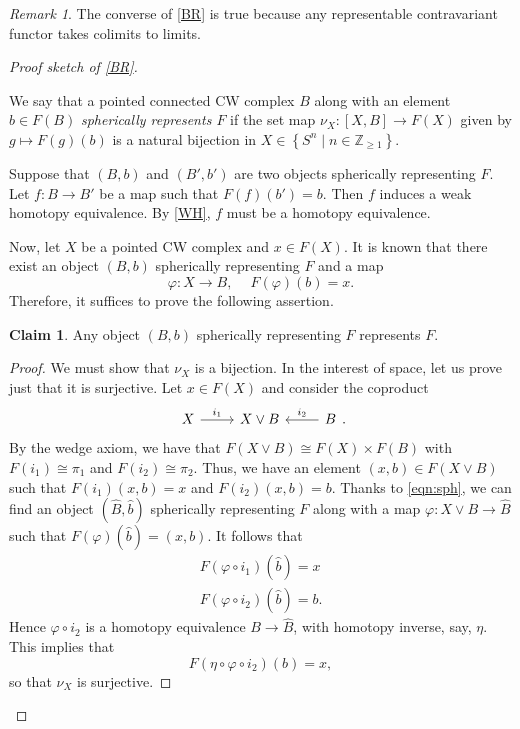\documentclass[10pt,letterpaper,cm]{nupset}
\theoremstyle{definition}
\theoremstyle{theorem}
\newtheorem*{claim}{Claim}
\theoremstyle{remark}
\newtheorem{remark}[defn]{Remark}
\newcommand{\Z}{\mathbb Z}
\newcommand{\1}{\mathbb{1}}
\newcommand{\0}{\vec 0}
\begin{document}
\begin{remark}
The converse of \cref{BR} is true because any representable contravariant functor takes colimits to limits.
\end{remark}

\begin{proof}[Proof sketch of \cref{BR}] $ $

We say that a pointed  connected CW complex $B$ along with an element $b\in F(B)$ \textit{spherically represents $F$} if the set map $\nu_X : \left[X, B\right] \to F(X)$ given by $g\mapsto F(g)(b)$ is a natural bijection in $X\in \left\{S^n \mid n\in \Z_{\geq 1}\right\}$. 

\smallskip

Suppose that $\left(B, b\right)$ and $\left(B', b'\right)$ are two objects spherically representing $F$. Let $f : B \to B'$ be a map such that $F(f)(b') = b$. Then $f$ induces a weak homotopy equivalence. By \cref{WH}, $f$ must be a homotopy equivalence.

\smallskip

Now, let $X$ be a pointed CW complex and $x\in F(X)$. It is known that there exist an object $\left(B, b\right)$ spherically representing $F$ and a map 
\[ \label{eqn:sph}
\varphi : X \to B, \ \quad F(\varphi)(b) =x \tag{$\bullet$}
.\] Therefore, it suffices to prove the following assertion.

\begin{claim}
Any object $\left(B, b\right)$ spherically representing $F$ represents $F$.
\end{claim}
\begin{proof}
We must show that $\nu_X$ is a bijection. In the interest of space, let us prove just that it is surjective.  Let $x\in F(X)$ and consider the coproduct
\[
\begin{tikzcd}
X \arrow[r, "i_1"] & X\vee B & B \arrow[l, "i_2"']
\end{tikzcd}.
\] By the wedge axiom, we have that $F(X\vee B) \cong F(X)\times F(B)$ with $F(i_1) \cong \pi_1$ and $F(i_2) \cong \pi_2$. Thus, we have an element $\left(x,b\right) \in F(X\vee B)$ such that $F(i_1)(x,b) = x$ and $F(i_2)(x,b) =b$. Thanks to \eqref{eqn:sph}, we can find an object $\left(\widehat{B}, \hat{b}\right)$ spherically representing $F$ along with a map $\varphi : X \vee B \to \widehat{B}$ such that $F(\varphi)\left(\hat{b}\right) = \left(x, b\right)$. It follows that
\begin{gather*}
F(\varphi \circ i_1)\left(\hat{b}\right) = x
\\  F(\varphi \circ i_2)\left(\hat{b}\right) = b.
\end{gather*} Hence $\varphi \circ i_2$ is a homotopy equivalence $B \to \widehat{B}$, with homotopy inverse, say, $\eta$. This implies that $$F(\eta \circ \varphi \circ i_2)(b) = x,$$ so that $\nu_X$ is surjective.
\end{proof}

\end{proof}
\end{document}
